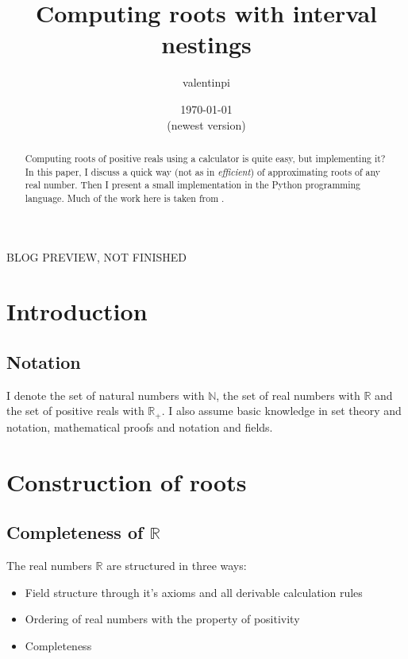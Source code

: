 \documentclass[a4paper, 10pt]{article}
\theoremstyle{definition}
\theoremstyle{definition}
\begin{document}
    \title{
        \vspace{-5ex}
        \large Computing roots with interval nestings
    }
    \author{
        \normalsize valentinpi
    }
    \date{
        \normalsize \today\\
        (newest version)
    }
    \maketitle

    \begin{abstract}
        Computing roots of positive reals using a calculator is quite easy, but implementing it? In this paper, I discuss a quick way (not as in \emph{efficient}) of approximating roots of any real number. Then I present a small implementation in the Python programming language. Much of the work here is taken from \cite{analysiskoenigsberger}.
    \end{abstract}

    \begin{center}
        \huge
        BLOG PREVIEW, NOT FINISHED
    \end{center}
    
    \tableofcontents

    \section{Introduction}
    
    \subsection{Notation}
    
    I denote the set of natural numbers with \(\mathbb{N}\), the set of real numbers with \(\mathbb{R}\) and the set of positive reals with \(\mathbb{R}_+\). I also assume basic knowledge in set theory and notation, mathematical proofs and notation and fields.
    
    \section{Construction of roots}
    
    \subsection{Completeness of \texorpdfstring{\(\mathbb{R}\)}{R}}
    The real numbers \(\mathbb{R}\) are structured in three ways:
    \begin{itemize}
        \item Field structure through it's axioms and all derivable calculation rules
        \item Ordering of real numbers with the property of positivity
        \item Completeness
    \end{itemize}
    
\end{document}
